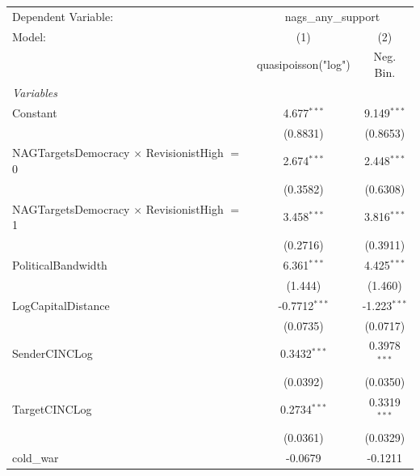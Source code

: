 
\begingroup
\centering
\begin{tabular}{lcc}
   \tabularnewline \midrule \midrule
   Dependent Variable: & \multicolumn{2}{c}{nags\_any\_support}\\
   Model:                                              & (1)                  & (2)\\  
                                                       &  quasipoisson("log") & Neg. Bin.\\  
   \midrule
   \emph{Variables}\\
   Constant                                            & 4.677$^{***}$        & 9.149$^{***}$\\   
                                                       & (0.8831)             & (0.8653)\\   
   NAGTargetsDemocracy $\times$ RevisionistHigh $=$ 0  & 2.674$^{***}$        & 2.448$^{***}$\\   
                                                       & (0.3582)             & (0.6308)\\   
   NAGTargetsDemocracy $\times$ RevisionistHigh $=$ 1  & 3.458$^{***}$        & 3.816$^{***}$\\   
                                                       & (0.2716)             & (0.3911)\\   
   PoliticalBandwidth                                  & 6.361$^{***}$        & 4.425$^{***}$\\   
                                                       & (1.444)              & (1.460)\\   
   LogCapitalDistance                                  & -0.7712$^{***}$      & -1.223$^{***}$\\   
                                                       & (0.0735)             & (0.0717)\\   
   SenderCINCLog                                       & 0.3432$^{***}$       & 0.3978$^{***}$\\   
                                                       & (0.0392)             & (0.0350)\\   
   TargetCINCLog                                       & 0.2734$^{***}$       & 0.3319$^{***}$\\   
                                                       & (0.0361)             & (0.0329)\\   
   cold\_war                                           & -0.0679              & -0.1211\\   

\end{tabular}
